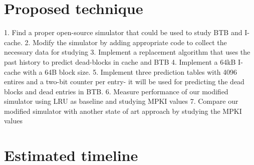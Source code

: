 \documentclass[11pt]{article}
\begin{document}
\section{Proposed technique}
\label{sec:proposed}
1.	Find a proper open-source simulator that could be used to study BTB and I-cache.
2.	Modify the simulator by adding appropriate code to collect the necessary data for studying
3.	Implement a replacement algorithm that uses the past history to predict dead-blocks in cache and BTB
4.	Implement a 64kB I-cache with a 64B block size.
5.	Implement three prediction tables with 4096 entires and a two-bit counter per entry- it will be used for predicting the dead blocks and dead entries in BTB.
6.	Measure performance of our modified simulator using LRU as baseline and studying MPKI values
7.	Compare our modified simulator with another state of art approach by studying the MPKI values


\section{Estimated timeline}
\label{sec:timeline}



{%
	
	
	}
\end{document}
